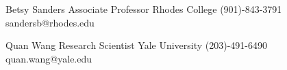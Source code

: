 \documentclass[11pt,letterpaper,roman]{moderncv} %
\begin{document}
\cventry{}
{Betsy Sanders}
{\newline{}Associate Professor}
{\newline{}Rhodes College}{}
{
(901)-843-3791
\newline{}sandersb@rhodes.edu
\newline{}
}

\cventry{}
{Quan Wang}
{\newline{}Research Scientist}
{\newline{}Yale University}{}
{
(203)-491-6490
\newline{}quan.wang@yale.edu
\newline{}
}




\end{document}
